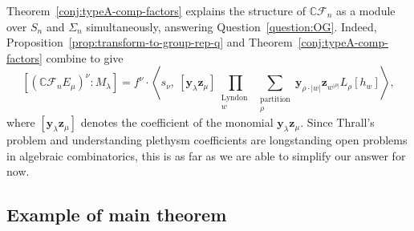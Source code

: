 \documentclass[ALCO, Unicode]{cedram}
\def\C{{\mathbb{C}}}
\begin{document}
Theorem~\ref{conj:typeA-comp-factors} explains the structure of $\C \mathcal{F}_n$ as a module over $S_n$ and $\Sigma_n$ simultaneously, answering Question~\ref{question:OG}. Indeed, Proposition~\ref{prop:transform-to-group-rep-q} and Theorem~\ref{conj:typeA-comp-factors} combine to give
\begin{equation}\label{eqn:answer}
    \left[\left(\C\mathcal{F}_nE_\mu\right)^\nu: M_\lambda\right] = f^\nu \cdot \left \langle s_\nu, \ [\mathbf{y}_\lambda\mathbf{z}_\mu] \prod_{\substack{\text{Lyndon }\\ w}} \sum_{\substack{\text{partition}\\\rho}} \mathbf{y}_{\rho \cdot |w|}\mathbf{z}_{w^{|\rho|}}L_{\rho}[h_w] \right \rangle,
\end{equation}
where \textbf{$[\mathbf{y}_\lambda \mathbf{z}_\mu]$} denotes the coefficient of the monomial $\mathbf{y}_\lambda \mathbf{z}_\mu.$ Since Thrall's problem and understanding plethysm coefficients are longstanding open problems in algebraic combinatorics, this is as far as we are able to simplify our answer for now.

\subsection{Example of main theorem}\label{subsec:examples}
\end{document}

